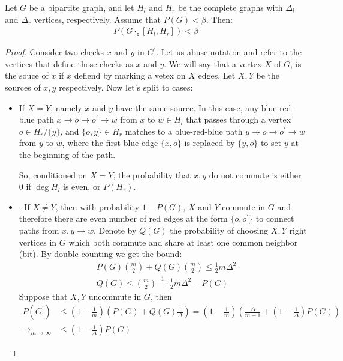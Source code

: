 \begin{claim}  
Let $G$ be a bipartite graph, and let $H_{l}$ and $H_{r}$ be the complete graphs with $\Delta_{l}$ and $\Delta_{r}$ vertices, respectively. Assume that $P(G) < \beta$. Then:
\begin{equation*}
  \begin{split}
      P(G \cdot_{z} [H_{l},H_{r}]) < \beta
  \end{split}
\end{equation*}
\end{claim}
\begin{proof}
  Consider two checks $x$ and $y$ in $G^{\prime}$. Let us abuse notation and refer to the vertices that define those checks as $x$ and $y$. We will say that a vertex $X$ of $G$, is the souce of $x$ if $x$ defiend by marking a vetex on $X$ edges. Let $X,Y$ be the sources of $x,y$ respectively. Now let's split to cases:
  \begin{itemize}
    \item If $X = Y$, namely $x$ and $y$ have the same source. In this case, any blue-red-blue path $x \rightarrow o \rightarrow o^{\prime} \rightarrow w$ from $x$ to $w \in H_{l}$ that passes through a vertex $o \in H_{r}/\{y\}$, and $\{o,y\} \in H_{r}$ matches to a blue-red-blue path $y \rightarrow o \rightarrow o^{\prime} \rightarrow w$ from $y$ to $w$, where the first blue edge $\{ x, o \}$ is replaced by $\{ y, o \}$ to set $y$ at the beginning of the path.
   
    So, conditioned on $X=Y$, the probability that $x,y$ do not commute is either $0$ if $\deg H_{l}$ is even, or $P(H_{r})$.
  \item {}. If $X\neq Y$, then with probability $1 - P(G)$, $X$ and $Y$ commute in $G$ and therefore there are even number of red edges at the form $\{o , o^{\prime}\}$ to connect paths from $x,y \rightarrow w$. Denote by $Q(G)$ the probability of choosing $X,Y$ right vertices in $G$ which both commute and share at least one common neighbor (bit).  
By double counting we get the bound: 
    \begin{equation*}
      \begin{split}
        & P(G){ m \choose 2} + Q(G){ m \choose 2} \le \frac{1}{2}m \Delta^{2} \\ 
        & Q(G) \le { m \choose 2 }^{-1}\cdot \frac{1}{2}m\Delta^{2} - P(G)
      \end{split}
    \end{equation*}
    Suppose that $X,Y$ uncommute in $G$, then  
    \begin{equation*}
      \begin{split}
        P(G^{\prime})  & \le \left( 1 - \frac{1}{m} \right) \left( P(G) + Q(G)  \frac{1}{\Delta} \right) = \left( 1 - \frac{1}{m} \right) \left(  \frac{\Delta}{m-1} + \left( 1 -  \frac{1}{\Delta}\right)P(G) \right) \\
       \rightarrow_{m \rightarrow \infty } & \le  \left(  1 - \frac{1}{\Delta} \right)P(G)
      \end{split}
    \end{equation*}

  \end{itemize}
\end{proof}


